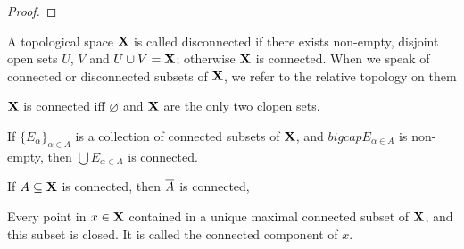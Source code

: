 \documentclass[../../main.tex]{subfiles}
\begin{document}
\begin{wts}
    
\end{wts}
\begin{proof}
    
\end{proof}
\newpage

\begin{wts}
    A topological space ${\mathbf{X}}$ is called disconnected if there exists non-empty, disjoint open sets $U$, $V$ and $U\cup V = {\mathbf{X}}$; otherwise ${\mathbf{X}}$ is connected. When we speak of connected or disconnected subsets of ${\mathbf{X}}$, we refer to the relative topology on them
    \begin{enumalpha}
        \item ${\mathbf{X}}$ is connected iff $\varnothing$ and ${\mathbf{X}}$ are the only two clopen sets.
        \item If $\{E_\alpha\}_{\alpha\in A}$ is a collection of connected subsets of ${\mathbf{X}}$, and $bigcap E_{\alpha\in A}$ is non-empty, then $\bigcup E_{\alpha\in A}$ is connected.
        \item If $A\subseteq{\mathbf{X}}$ is connected, then $\overline{A}$ is connected,
        \item Every point in $x\in{\mathbf{X}}$ contained in a unique maximal connected subset of ${\mathbf{X}}$, and this subset is closed. It is called the connected component of $x$.
    \end{enumalpha}
\end{wts}
\end{document}
